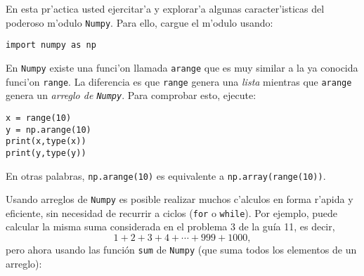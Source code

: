 \documentclass[11pt]{exam}
\begin{document}
\firstpageheadrule
\runningheadrule
{}
\cfoot{ }
\begin{flushleft}
\vspace{0.2in}

\vspace{0.25cm}
\end{flushleft}

\begin{questions}


\item En esta pr'actica usted ejercitar'a y explorar'a algunas caracter'isticas del poderoso m'odulo \texttt{Numpy}. Para ello, cargue el m'odulo usando:

\begin{verbatim}
import numpy as np
\end{verbatim}

\item En \texttt{Numpy} existe una funci'on llamada \texttt{arange} que es muy similar a la ya conocida funci'on \texttt{range}. La diferencia es que \texttt{range} genera una \textit{lista} mientras que \texttt{arange} genera un \textit{arreglo de \texttt{Numpy}}. Para comprobar esto, ejecute:

\begin{verbatim}
x = range(10)
y = np.arange(10)
print(x,type(x))
print(y,type(y))
\end{verbatim}

En otras palabras, \texttt{np.arange(10)} es equivalente a \texttt{np.array(range(10))}.

\item Usando arreglos de \texttt{Numpy} es posible realizar muchos c'alculos en forma r'apida y eficiente, sin necesidad de recurrir a ciclos (\texttt{for} o \texttt{while}). Por ejemplo, puede calcular la misma suma considerada en el problema 3 de la guía 11, es decir, 
\begin{equation}
1 + 2 + 3 + 4  + \cdots + 999 + 1000,
\end{equation}
pero ahora usando las función \texttt{sum} de \texttt{Numpy} (que suma todos los elementos de un arreglo):


\end{questions}
\end{document}
